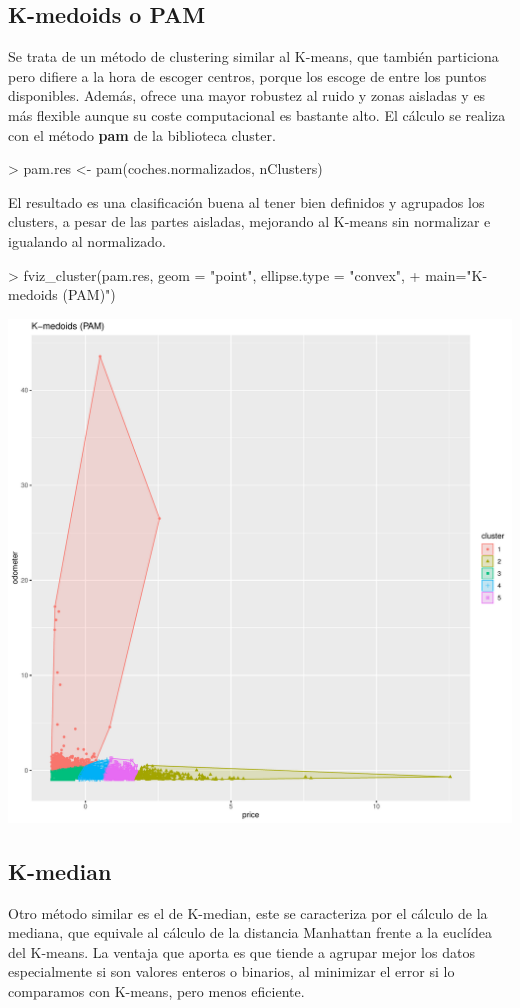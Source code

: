 \documentclass[a4paper]{article}
\begin{document}
\subsection{K-medoids o PAM}
Se trata de un método de clustering similar al K-means, que también particiona pero difiere a la hora de escoger centros, porque los escoge de entre los puntos disponibles. Además, ofrece una mayor robustez al ruido y zonas aisladas y es más flexible aunque su coste computacional es bastante alto. El cálculo se realiza con el método \textbf{pam} de la biblioteca cluster.
\begin{Schunk}
\begin{Sinput}
> pam.res <- pam(coches.normalizados, nClusters)
\end{Sinput}
\end{Schunk}
El resultado es una clasificación buena al tener bien definidos y agrupados los clusters, a pesar de las partes aisladas, mejorando al K-means sin normalizar e igualando al normalizado.
\begin{Schunk}
\begin{Sinput}
> fviz_cluster(pam.res, geom = "point", ellipse.type = "convex",
+              main="K-medoids (PAM)")
\end{Sinput}
\end{Schunk}
\includegraphics{Practica4-Kmedoids}
\subsection{K-median}
Otro método similar es el de K-median, este se caracteriza por el cálculo de la mediana, que equivale al cálculo de la distancia Manhattan frente a la euclídea del K-means. La ventaja que aporta es que tiende a agrupar mejor los datos especialmente si son valores enteros o binarios, al minimizar el error si lo comparamos con K-means, pero menos eficiente.
\end{document}
